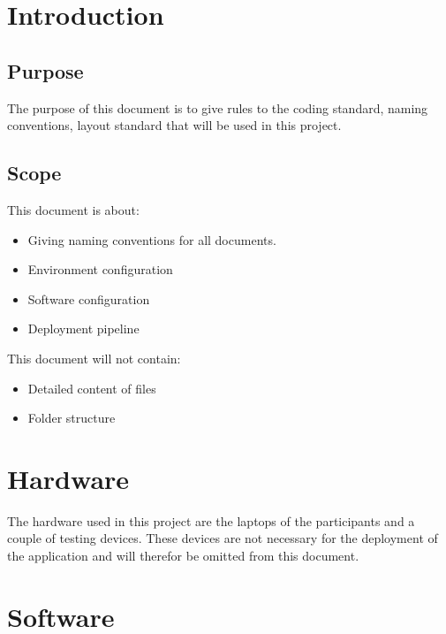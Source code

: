 \documentclass[12pt]{article}
\begin{document}
	\clearpage
	\printglossary[type=\acronymtype]
    \printglossary

	\clearpage

	\tableofcontents

	\clearpage

	\section{Introduction}

	\subsection{Purpose}

	The purpose of this document is to give rules to the coding standard, naming conventions, layout standard that will be used in this project.

	\subsection{Scope}

	This document is about:

	\begin{itemize}
		\item Giving naming conventions for all documents.
		\item Environment configuration
		\item Software configuration
		\item Deployment pipeline
	\end{itemize}


	This document will not contain:

	\begin{itemize}
		\item Detailed content of files
		\item Folder structure
	\end{itemize}

	\clearpage
	\section{Hardware}

	The hardware used in this project are the laptops of the participants and a couple of testing devices. These devices are not necessary for the deployment of the application and will therefor be omitted from this document.

	\section{Software}
\end{document}
